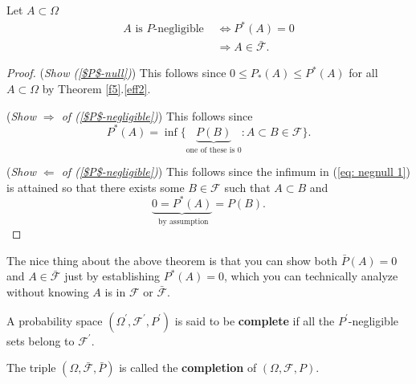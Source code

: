 \begin{theorem}
Let $A\subset \Omega$
\begin{align}
\text{$A$ is $P$-negligible }&\Longleftrightarrow P^*(A)=0\label{$P$-negligible}\\
&\Longrightarrow A\in \bar{\mathcal F} \label{$P$-null}.
\end{align}
\end{theorem}
\begin{proof}
({\sl Show (\ref{$P$-null})}) This follows since $0\leq P_*(A)\leq P^*(A)$ for all $A\subset \Omega$ by Theorem \ref{f5}.\ref{eff2}.

({\sl Show $\Longrightarrow$ of (\ref{$P$-negligible})}) This follows since
\begin{equation}
\label{eq: negnull 1}
 P^*(A) = \inf\{\underbrace{P(B)}_{\text{one of these is $0$}}\colon A\subset B\in \mathcal F  \}.
 \end{equation}

({\sl Show $\Longleftarrow$ of (\ref{$P$-negligible})})
This follows since the infimum in (\ref{eq: negnull 1}) is attained so that there exists some $B\in \mathcal F$ such that $A\subset B $ and
\[  \underbrace{0 = P^*(A)}_{\text{ by assumption}}=P(B). \]

\end{proof}

The nice  thing about the above theorem is that you can show both $\bar P(A) = 0$ and $A\in \bar{\mathcal F}$ just by establishing $P^*(A)=0$, which you can technically analyze without knowing $A$ is in $\mathcal F$ or $\bar{\mathcal F}$.

\begin{definition}[{\bf Complete}]
A probability space $(\Omega^\prime, \mathcal F^\prime, P^\prime)$ is said to be {\bf complete} if all the $P^\prime$-negligible sets belong to $\mathcal F^\prime$.
\end{definition}

\begin{definition}
The triple $(\Omega, \bar{\mathcal F}, \bar P)$ is called the {\bf completion} of  $(\Omega, \mathcal F, P)$.
\end{definition}




